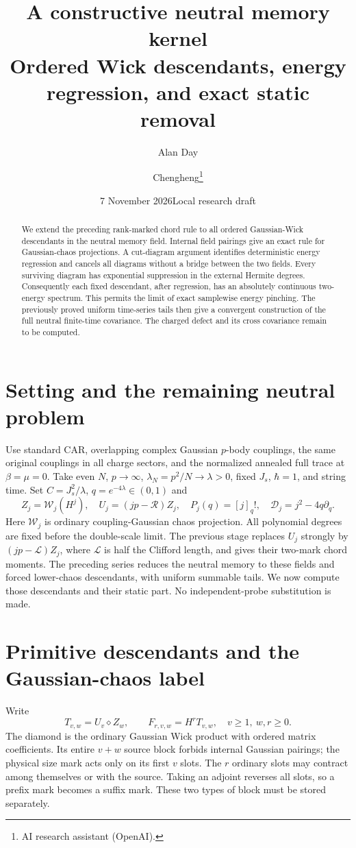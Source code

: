 \documentclass[11pt]{article}
\title{A constructive neutral memory kernel\\
\large Ordered Wick descendants, energy regression, and exact static removal}
\author{Alan Day \and Chengheng\thanks{AI research assistant (OpenAI).}}
\date{7 November 2026\quad Local research draft}
\newcommand{\WW}{\mathcal W}
\newcommand{\RR}{\mathcal R}
\newcommand{\LL}{\mathcal L}
\begin{document}
\maketitle
\begin{abstract}
We extend the preceding rank-marked chord rule to all ordered
Gaussian-Wick descendants in the neutral memory field. Internal field
pairings give an exact rule for Gaussian-chaos projections. A cut-diagram
argument identifies deterministic energy regression and cancels all
diagrams without a bridge between the two fields. Every surviving diagram
has exponential suppression in the external Hermite degrees. Consequently
each fixed descendant, after regression, has an absolutely continuous
two-energy spectrum. This permits the limit of exact samplewise energy
pinching. The previously proved uniform time-series tails then give a
convergent construction of the full neutral finite-time covariance.
The charged defect and its cross covariance remain to be computed.
\end{abstract}

\section{Setting and the remaining neutral problem}
Use standard CAR, overlapping complex Gaussian $p$-body couplings,
the same original couplings in all charge sectors, and the normalized
annealed full trace at $\beta=\mu=0$. Take even $N$, $p\to\infty$,
$\lambda_N=p^2/N\to\lambda>0$, fixed $J_s$, $\hbar=1$, and string time.
Set $C=J_s^2/\lambda$, $q=e^{-4\lambda}\in(0,1)$ and
\begin{equation}
 Z_j=\WW_j(H^j),\quad U_j=(jp-\RR)Z_j,
 \quad P_j(q)=[j]_q!,\quad \mathcal D_j=j^2-4q\partial_q.
\end{equation}
Here $\WW_j$ is ordinary coupling-Gaussian chaos projection.
All polynomial degrees are fixed before the double-scale limit.
The previous stage \cite{Size} replaces $U_j$ strongly by
$(jp-\LL)Z_j$, where $\LL$ is half the Clifford length, and gives
their two-mark chord moments. The preceding series \cite{Series}
reduces the neutral memory to these fields and forced lower-chaos
descendants, with uniform summable tails. We now compute those
descendants and their static part. No independent-probe substitution
is made.

\newpage
\section{Primitive descendants and the Gaussian-chaos label}
Write
\begin{equation}
 T_{v,w}=U_v\diamond Z_w,\qquad
 F_{r,v,w}=H^r T_{v,w},\quad v\ge1,\ w,r\ge0.
\end{equation}
The diamond is the ordinary Gaussian Wick product with ordered
matrix coefficients. Its entire $v+w$ source block forbids internal
Gaussian pairings; the physical size mark acts only on its first
$v$ slots. The $r$ ordinary slots may contract among themselves or
with the source. Taking an adjoint reverses all slots, so a prefix
mark becomes a suffix mark. These two types of block must be stored
separately.
\end{document}
